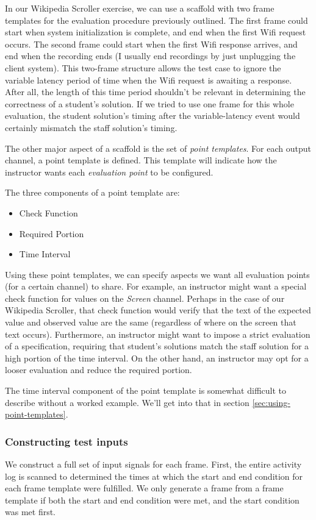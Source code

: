 \documentclass[12pt]{article}
\begin{document}
In our Wikipedia Scroller exercise, we can use a scaffold with two frame templates for the evaluation procedure previously outlined.  The first frame could start when system initialization is complete, and end when the first Wifi request occurs.  The second frame could start when the first Wifi response arrives, and end when the recording ends (I usually end recordings by just unplugging the client system).  This two-frame structure allows the test case to ignore the variable latency period of time when the Wifi request is awaiting a response.  After all, the length of this time period shouldn't be relevant in determining the correctness of a student's solution.  If we tried to use one frame for this whole evaluation, the student solution's timing after the variable-latency event would certainly mismatch the staff solution's timing.

The other major aspect of a scaffold is the set of \textit{point templates}.  For each output channel, a point template is defined.  This template will indicate how the instructor wants each \textit{evaluation point} to be configured.

The three components of a point template are:

\begin{itemize}
\item Check Function
\item Required Portion
\item Time Interval
\end{itemize}

Using these point templates, we can specify aspects we want all evaluation points (for a certain channel) to share.  For example, an instructor might want a special check function for values on the \textit{Screen} channel.  Perhaps in the case of our Wikipedia Scroller, that check function would verify that the text of the expected value and observed value are the same (regardless of where on the screen that text occurs).  Furthermore, an instructor might want to impose a strict evaluation of a specification, requiring that student's solutions match the staff solution for a high portion of the time interval.  On the other hand, an instructor may opt for a looser evaluation and reduce the required portion.

The time interval component of the point template is somewhat difficult to describe without a worked example.  We'll get into that in section \ref{sec:using-point-templates}.

\subsubsection{Constructing test inputs}
We construct a full set of input signals for each frame. First, the entire activity log is scanned to determined the times at which the start and end condition for each frame template were fulfilled.  We only generate a frame from a frame template if both the start and end condition were met, and the start condition was met first.
\end{document}
